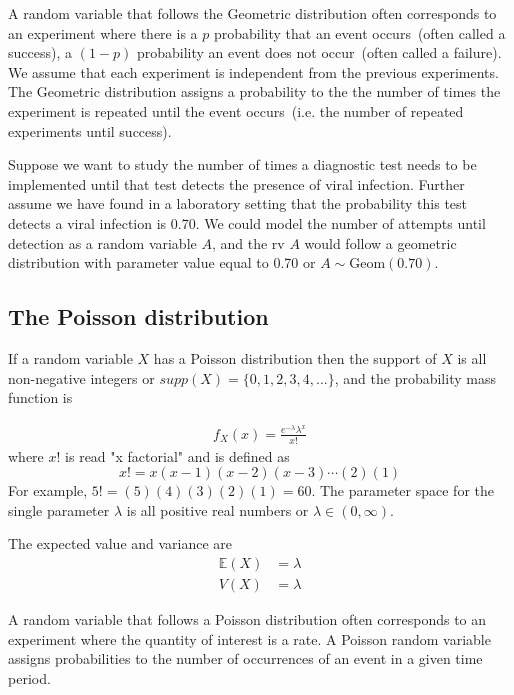A random variable that follows the Geometric distribution often corresponds to an experiment where there is a $p$ probability that an event occurs~(often called a success), a $(1-p)$ probability an event does not occur~(often called a failure). 
We assume that each experiment is independent from the previous experiments.
The Geometric distribution assigns a probability to the the number of times the experiment is repeated until the event occurs~(i.e. the number of repeated experiments until success).

\ex Suppose we want to study the number of times a diagnostic test needs to be implemented until that test detects the presence of viral infection. Further assume we have found in a laboratory setting that the probability this test detects a viral infection is 0.70. We could model the number of attempts until detection as a random variable $A$, and the rv $A$ would follow a geometric distribution with parameter value equal to 0.70 or $A \sim \text{Geom}(0.70)$. 

\subsection{The Poisson distribution }

If a random variable $X$ has a Poisson distribution then the support of $X$ is all non-negative integers or $supp(X) = \{0,1,2,3,4,...\}$, and the probability mass function is 

\begin{align}
    f_{X}(x) = \frac{e^{-\lambda} \lambda^{x}}{x!}
\end{align}
where $x!$ is read "x factorial" and is defined as 
\begin{equation}
    x!=x (x-1) (x-2) (x-3) \cdots (2) (1)
\end{equation}
For example, $5! = (5)(4)(3)(2)(1) = 60$.
The parameter space for the single parameter $\lambda$ is all positive real numbers or $\lambda \in (0,\infty)$. 

The expected value and variance are
\begin{align}
    \mathbb{E}(X) &= \lambda \\ 
             V(X) &= \lambda 
\end{align}

A random variable that follows a Poisson distribution often corresponds to an experiment where the quantity of interest is a rate. A Poisson random variable assigns probabilities to the number of occurrences of an event in a given time period. 

